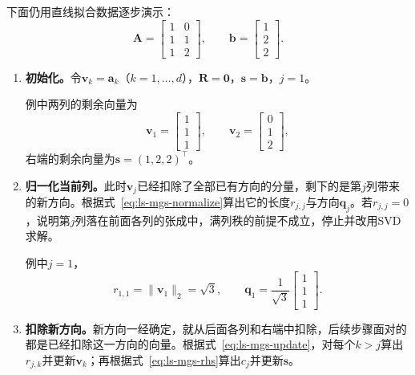 下面仍用直线拟合数据逐步演示：
\[
  \bm A=\begin{bmatrix}1&0\\1&1\\1&2\end{bmatrix},\qquad \bm b=\begin{bmatrix}1\\2\\2\end{bmatrix}.
\]

\begin{enumerate}
 \item \textbf{初始化。}令$\bm v_k=\bm a_k$（$k=1,\ldots,d$），$\bm R=\bm0$，$\bm s=\bm b$，$j=1$。

 例中两列的剩余向量为
 \[
  \bm v_1=\begin{bmatrix}1\\1\\1\end{bmatrix},\qquad
  \bm v_2=\begin{bmatrix}0\\1\\2\end{bmatrix},
 \]
 右端的剩余向量为$\bm s=(1,2,2)^\top$。

 \item \textbf{归一化当前列。}此时$\bm v_j$已经扣除了全部已有方向的分量，剩下的是第$j$列带来的新方向。根据式~\eqref{eq:ls-mgs-normalize}算出它的长度$r_{j,j}$与方向$\bm q_j$。若$r_{j,j}=0$，说明第$j$列落在前面各列的张成中，满列秩的前提不成立，停止并改用SVD求解。

 例中$j=1$，
 \[
  r_{1,1}=\lVert\bm v_1\rVert_2=\sqrt3,\qquad
  \bm q_1=\frac1{\sqrt3}\begin{bmatrix}1\\1\\1\end{bmatrix}.
 \]

 \item \textbf{扣除新方向。}新方向一经确定，就从后面各列和右端中扣除，后续步骤面对的都是已经扣除这一方向的向量。根据式~\eqref{eq:ls-mgs-update}，对每个$k>j$算出$r_{j,k}$并更新$\bm v_k$；再根据式~\eqref{eq:ls-mgs-rhs}算出$c_j$并更新$\bm s$。


\end{enumerate}
